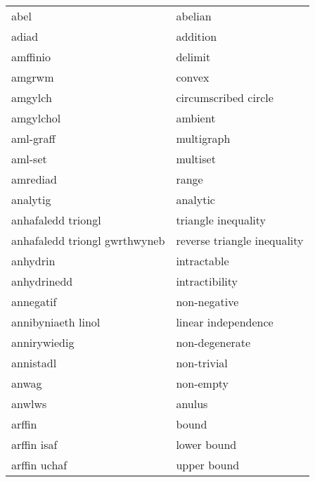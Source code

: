 \begin{supertabular}{p{0.22\textwidth}p{0.22\textwidth}}
                            abel &                           abelian \\
                           adiad &                          addition \\
                        amffinio &                           delimit \\
                          amgrwm &                            convex \\
                         amgylch &              circumscribed circle \\
                       amgylchol &                           ambient \\
                       aml-graff &                        multigraph \\
                         aml-set &                          multiset \\
                        amrediad &                             range \\
                        analytig &                          analytic \\
              anhafaledd triongl &               triangle inequality \\
   anhafaledd triongl gwrthwyneb &       reverse triangle inequality \\
                        anhydrin &                       intractable \\
                     anhydrinedd &                    intractibility \\
                       annegatif &                      non-negative \\
              annibyniaeth linol &               linear independence \\
                    annirywiedig &                    non-degenerate \\
                       annistadl &                       non-trivial \\
                           anwag &                         non-empty \\
                          anwlws &                            anulus \\
                          arffin &                             bound \\
                     arffin isaf &                       lower bound \\
                    arffin uchaf &                       upper bound \\

\end{supertabular}
